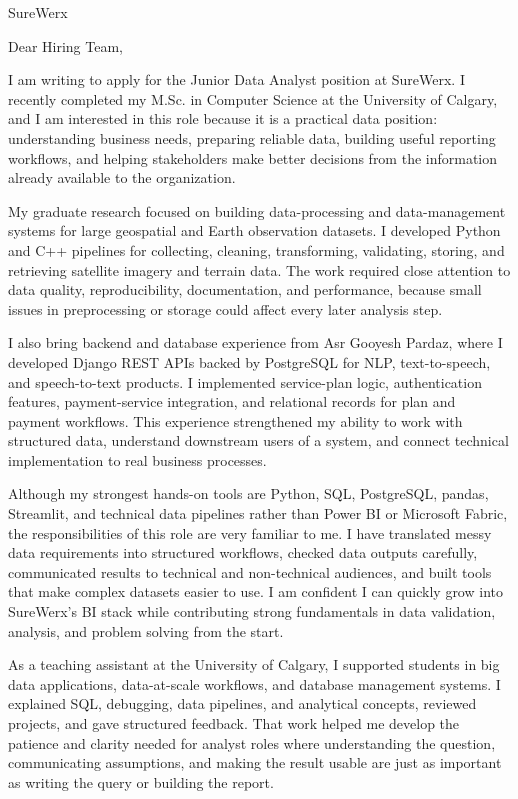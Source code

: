 \documentclass[11pt]{letter}
\begin{document}
\begin{letter}{SureWerx}

\opening{Dear Hiring Team,}

I am writing to apply for the Junior Data Analyst position at SureWerx. I recently completed my M.Sc. in Computer Science at the University of Calgary, and I am interested in this role because it is a practical data position: understanding business needs, preparing reliable data, building useful reporting workflows, and helping stakeholders make better decisions from the information already available to the organization.

My graduate research focused on building data-processing and data-management systems for large geospatial and Earth observation datasets. I developed Python and C++ pipelines for collecting, cleaning, transforming, validating, storing, and retrieving satellite imagery and terrain data. The work required close attention to data quality, reproducibility, documentation, and performance, because small issues in preprocessing or storage could affect every later analysis step.

I also bring backend and database experience from Asr Gooyesh Pardaz, where I developed Django REST APIs backed by PostgreSQL for NLP, text-to-speech, and speech-to-text products. I implemented service-plan logic, authentication features, payment-service integration, and relational records for plan and payment workflows. This experience strengthened my ability to work with structured data, understand downstream users of a system, and connect technical implementation to real business processes.

Although my strongest hands-on tools are Python, SQL, PostgreSQL, pandas, Streamlit, and technical data pipelines rather than Power BI or Microsoft Fabric, the responsibilities of this role are very familiar to me. I have translated messy data requirements into structured workflows, checked data outputs carefully, communicated results to technical and non-technical audiences, and built tools that make complex datasets easier to use. I am confident I can quickly grow into SureWerx's BI stack while contributing strong fundamentals in data validation, analysis, and problem solving from the start.

As a teaching assistant at the University of Calgary, I supported students in big data applications, data-at-scale workflows, and database management systems. I explained SQL, debugging, data pipelines, and analytical concepts, reviewed projects, and gave structured feedback. That work helped me develop the patience and clarity needed for analyst roles where understanding the question, communicating assumptions, and making the result usable are just as important as writing the query or building the report.


\end{letter}
\end{document}
